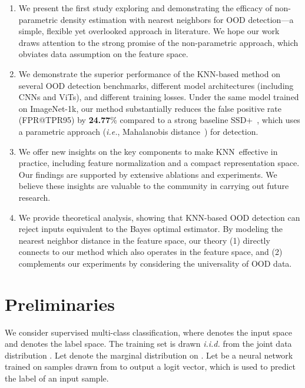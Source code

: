 \documentclass[nohyperref]{article}
\newcommand{\method}{{KNN}}
\theoremstyle{plain}
\theoremstyle{definition}
\theoremstyle{remark}
\begin{document}
\begin{enumerate}

\item We present the first study exploring and demonstrating the efficacy of non-parametric density estimation with nearest neighbors for OOD detection---a simple, flexible yet overlooked approach in literature. We hope our work draws attention to the strong promise of the non-parametric approach, which obviates data assumption on the feature space.

\item We demonstrate the superior performance of the KNN-based method on several OOD detection benchmarks, different model architectures (including CNNs and ViTs), and different training losses. Under the same model trained on ImageNet-1k, our method substantially reduces the false positive rate (FPR@TPR95) by \textbf{24.77}\% compared to a strong baseline {SSD+}~\citep{2021ssd}, which uses a parametric approach (\emph{i.e.}, Mahalanobis distance~\citep{lee2018simple}) for detection.


\item We offer new insights on the key components to make \method~effective in practice, including feature normalization and a compact representation space. Our findings are supported by extensive ablations and experiments. We believe these insights are valuable to the community in carrying out future research.

\item We provide theoretical analysis, showing that KNN-based OOD detection can reject inputs equivalent to the Bayes optimal estimator. By modeling the nearest neighbor distance in
the feature space, our theory (1) directly connects to our method which also operates in the feature space, and (2) complements our experiments by considering the universality of OOD data. 

\end{enumerate}


 





\section{Preliminaries}
\label{sec:prelim}


We consider supervised multi-class classification, where  denotes the input space and  denotes the label space. The training set  is drawn \emph{i.i.d.} from the joint data distribution . Let  denote the marginal distribution on . Let  be a neural network trained on samples drawn from  to output a logit vector, which is used to predict the label of an input sample. 
 
\end{document}
